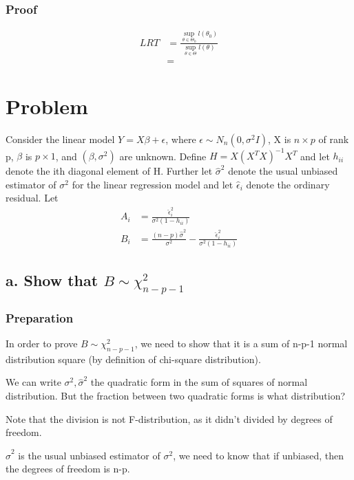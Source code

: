 \subsubsection{Proof}

\begin{align*}
	LRT &= \frac{\underset{\theta \in \Theta_0}{\sup} l(\theta_0)}{\underset{\theta \in \Theta}{\sup} l(\theta)} \\
	&= 
\end{align*}




\section{Problem }
Consider the linear model $Y = X \beta + \epsilon$, where $\epsilon \sim N_n(0, \sigma^2 I)$, X is $n \times p$ of rank p, $\beta$ is $p \times 1$, and $(\beta, \sigma^2)$ are unknown. Define $H = X(X^TX)^{-1}X^T$ and let $h_{ii}$ denote the ith diagonal element of H. Further let $\hat{\sigma}^2$ denote the usual unbiased estimator of $\sigma^2$ for the linear regression model and let $\hat{\epsilon}_i$ denote the ordinary residual. Let 
\begin{align*}
	A_i & = \frac{\hat{\epsilon}_i^2}{\sigma^2(1-h_{ii})} \\
	B_i & = \frac{(n-p)\hat{\sigma}^2 }{\sigma^2} - \frac{\hat{\epsilon}_i^2}{\sigma^2(1-h_{ii})}
\end{align*}

\subsection{a. Show that $B \sim \chi^2_{n-p-1}$}

\subsubsection{Preparation}
In order to prove $B \sim \chi^2_{n-p-1}$, we need to show that it is a sum of n-p-1 normal distribution square (by definition of chi-square distribution). 

We can write $\sigma^2, \hat{\sigma}^2$ the quadratic form in the sum of squares of normal distribution. But the fraction between two quadratic forms is what distribution? 

Note that the division is not F-distribution, as it didn't divided by degrees of freedom. 

$\hat{\sigma}^2$ is the usual unbiased estimator of $\sigma^2$, we need to know that if unbiased, then the degrees of freedom is n-p.

